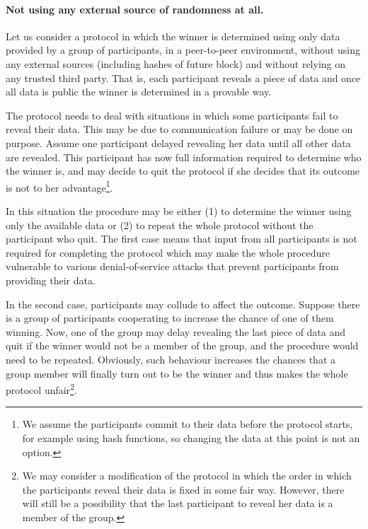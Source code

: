 \documentclass[a4paper]{article}
\begin{document}
    \paragraph{Not using any external source of randomness at all.}
    Let us consider a protocol in which the winner is determined using only data provided by a group of participants,
    in a peer-to-peer environment, without using any external sources (including hashes of future block) and without
    relying on any trusted third party. That is, each participant reveals a piece of data and once all data is public
    the winner is determined in a provable way.

    The protocol needs to deal with situations in which some participants fail to reveal their data. This may be due
    to communication failure or may be done on purpose. Assume one participant delayed revealing her data until all
    other data are revealed. This participant has now full information required to determine who the winner is,
    and may decide to quit the protocol if she decides that its outcome is not to her advantage\footnote{We assume
    the participants commit to their data before the protocol starts, for example using hash functions,
    so changing the data at this point is not an option.}.

    In this situation the procedure may be either (1) to determine the winner using only the available data or (2)
    to repeat the whole protocol without the participant who quit. The first case means that input from all
    participants is not required for completing the protocol which may make the whole procedure vulnerable to
    various denial-of-service attacks that prevent participants from providing their data.

    In the second case, participants may collude to affect the outcome. Suppose there is a group of participants
    cooperating to increase the chance of one of them winning. Now, one of the group may delay revealing the last
    piece of data and quit if the winner would not be a member of the group, and the procedure would need to be
    repeated. Obviously, such behaviour increases the chances that a group member will finally turn out to be the
    winner and thus makes the whole protocol unfair\footnote{We may consider a modification of the protocol in which
    the order in which the participants reveal their data is fixed in some fair way. However, there will still be
    a possibility that the last participant to reveal her data is a member of the group.}.
\end{document}
